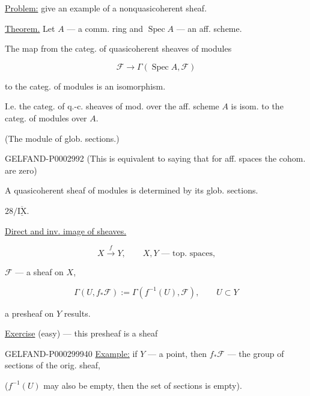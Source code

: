 \underline{Problem:} give an example of a nonquasicoherent sheaf.

\underline{Theorem.} Let $A$ --- a comm. ring and $\operatorname{Spec}A$ --- an aff. scheme.

The map from the categ. of quasicoherent sheaves of modules

\begin{equation*}\mathcal F\longrightarrow\Gamma (\operatorname{Spec}A,\mathcal F)\end{equation*}

to the categ. of modules is an isomorphism.

I.e. the categ. of q.-c. sheaves of mod. over the aff. scheme $A$ is isom.
to the categ. of modules over $A$.

(The module of glob. sections.)

\begin{GelfandAdjacentEvidence}{GELFAND-P000299}{2}
(This is equivalent to saying that for aff. spaces the cohom. are zero)

\end{GelfandAdjacentEvidence}


A quasicoherent sheaf of modules is determined by its glob. sections.

$28/\overline{\underline{\mathrm{IX}}}$.

\underline{Direct and inv. image of sheaves.}

\begin{equation*}X\overset f{\longrightarrow}Y,\qquad X, Y\text{ --- top. spaces,}\end{equation*}

$\mathcal F$ --- a sheaf on $X$,

\begin{equation*}\Gamma (U, f_*\mathcal F):=\Gamma (f^{-1}(U),\mathcal F),\qquad U\subset Y\end{equation*}

a presheaf on $Y$ results.

\underline{Exercise} (easy) --- this presheaf is a sheaf

\begin{GelfandAdjacentEvidence}{GELFAND-P000299}{940}
\underline{Example:} if $Y$ --- a point, then $f_*\mathcal F$ --- the group of sections of the orig. sheaf,

($f^{-1}(U)$ may also be empty, then the set of sections is empty).

\end{GelfandAdjacentEvidence}


